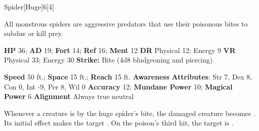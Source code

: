   \begin{monsection}{Spider}[Huge]{6}[4]
    \vspace{-1em}\vspace{-1em}
    \vspace{0em}

    
    All monstrous spiders are aggressive predators that use their poisonous bites to subdue or kill prey.
  
    

    \begin{spellcontent}
      \begin{spelltargetinginfo}
        \pari \textbf{HP} 36;
          \textbf{AD} 19;
          \textbf{Fort} 14;
          \textbf{Ref} 16;
          \textbf{Ment} 12
        \pari \textbf{DR} Physical 12; Energy 9
        \pari \textbf{VR} Physical 33; Energy 30
        \pari \textbf{Strike:}
            Bite  (4d8 bludgeoning and piercing)
      \end{spelltargetinginfo}
    \end{spellcontent}
    \begin{monsterfooter}
      \pari \textbf{Speed} 50 ft.;
        \textbf{Space} 15 ft.;
        \textbf{Reach} 15 ft.
      \pari \textbf{Awareness} 
      \pari \textbf{Attributes}:
        Str 7, Dex 8,
        Con 0, Int -9,
        Per 8, Wil 0
      \pari \textbf{Accuracy} 12;
        \textbf{Mundane Power} 10;
      \textbf{Magical Power} 6
      \pari \textbf{Alignment} Always true neutral
    \end{monsterfooter}
  \end{monsection}
    Whenever a creature is  by the huge spider's bite,
      the damaged creature becomes .
    Its initial effect makes the target .
    On the poison's third hit, the target is .
  
